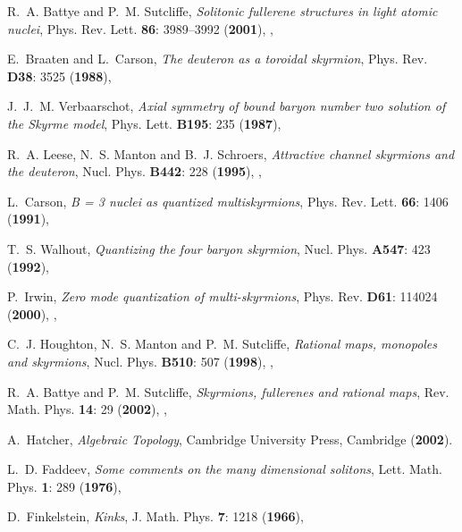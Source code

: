 \documentclass[a4paper,12pt]{article}
\begin{document}
\begin{small}
\begin{thebibliography}{10}
R.~A. Battye and P.~M. Sutcliffe, {\em Solitonic fullerene structures in light
  atomic nuclei\/}, Phys. Rev. Lett. {\bf 86}: 3989--3992 ({\bf 2001}),
  {},

E.~Braaten and L.~Carson, {\em The deuteron as a toroidal skyrmion\/}, Phys.
  Rev. {\bf D38}: 3525 ({\bf 1988}),

J.~J.~M. Verbaarschot, {\em Axial symmetry of bound baryon number two solution
  of the {S}kyrme model\/}, Phys. Lett. {\bf B195}: 235 ({\bf 1987}),

R.~A. Leese, N.~S. Manton and B.~J. Schroers, {\em Attractive channel skyrmions
  and the deuteron\/}, Nucl. Phys. {\bf B442}: 228 ({\bf 1995}),
  {},

L.~Carson, {\em B = 3 nuclei as quantized multiskyrmions\/}, Phys. Rev. Lett.
  {\bf 66}: 1406 ({\bf 1991}),

T.~S. Walhout, {\em Quantizing the four baryon skyrmion\/}, Nucl. Phys. {\bf
  A547}: 423 ({\bf 1992}),

P.~Irwin, {\em Zero mode quantization of multi-skyrmions\/}, Phys. Rev. {\bf
  D61}: 114024 ({\bf 2000}), {},

C.~J. Houghton, N.~S. Manton and P.~M. Sutcliffe, {\em Rational maps, monopoles
  and skyrmions\/}, Nucl. Phys. {\bf B510}: 507 ({\bf 1998}),
  {},

R.~A. Battye and P.~M. Sutcliffe, {\em Skyrmions, fullerenes and rational
  maps\/}, Rev. Math. Phys. {\bf 14}: 29 ({\bf 2002}),
  {},

A.~Hatcher, {\em Algebraic Topology\/}, Cambridge University Press, Cambridge
 ({\bf 2002}).

L.~D. Faddeev, {\em Some comments on the many dimensional solitons\/}, Lett.
  Math. Phys. {\bf 1}: 289 ({\bf 1976}),

D.~Finkelstein, {\em Kinks\/}, J. Math. Phys. {\bf 7}: 1218 ({\bf 1966}),


\end{thebibliography}
\end{small}
\end{document}
